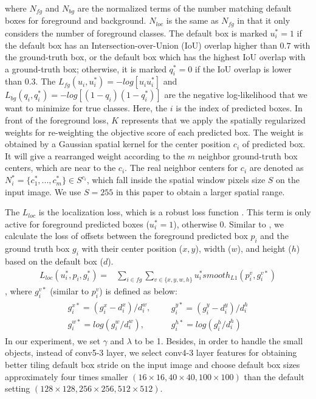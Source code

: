 \documentclass[10pt,twocolumn,letterpaper]{article}
\begin{document}
where $N_{fg}$ and $N_{bg}$ are the normalized terms of the number matching default boxes for foreground and background. $N_{loc}$ is the same as $N_{fg}$ in that it only considers the number of foreground classes. The default box is marked $u_{i}^{*} = 1$ if the default box has an Intersection-over-Union (IoU) overlap higher than $0.7$ with the ground-truth box, or the default box which has the highest IoU overlap with a ground-truth box; otherwise, it is marked $q_{i}^{*} = 0$ if the IoU overlap is lower than $0.3$. The $L_{fg}(u_{i}, u_{i}^{*}) = -log[u_{i}u_{i}^{*}]$ and $L_{bg}(q_{i}, q_{i}^{*}) = -log[(1-q_{i})(1-q_{i}^{*})]$ are the negative log-likelihood that we want to minimize for true classes. Here, the $i$ is the index of predicted boxes. In front of the foreground loss, $K$ represents that we apply the spatially regularized weights for re-weighting the objective score of each predicted box. The weight is obtained by a Gaussian spatial kernel for the center position $c_{i}$ of predicted box. It will give a rearranged weight according to the $m$ neighbor ground-truth box centers, which are near to the $c_{i}$. The real neighbor centers for $c_{i}$ are denoted as $N_{i}^{*} = \{c_{1}^{*},...,c_{m}^{*}\} \in S^{c_{i}}$, which fall inside the spatial window pixels size $S$ on the input image. We use $S = 255$ in this paper to obtain a larger spatial range.  

The $L_{loc}$ is the localization loss, which is a robust loss function \cite{20_girshick2015fast}. This term is only active for foreground predicted boxes ($u_{i}^{*} = 1$), otherwise $0$. Similar to \cite{21_ren2015faster}, we calculate the loss of offsets between the foreground predicted box $p_{i}$ and the ground truth box $g_{i}$ with their center position ($x, y$), width ($w$), and height ($h$) based on the default box ($d$).
\begin{equation} \label{eq:Llos}
\begin{aligned}
L_{loc}(u_{i}^{*}, p_{i}, g_{i}^{*}) =& \sum_{i \in fg} \sum_{v \in \{x, y, w, h\}} u_{i}^{*}smooth_{L1}(p_{i}^{v}, g_{i}^{v*})
\end{aligned}
\end{equation}
, where $g_{i}^{v*}$ (similar to $p_{i}^{v}$) is defined as below:
\begin{align}
  \begin{aligned}
   g_{i}^{x*} = (g_{i}^{x} - d_{i}^{x}) / d_{i}^{w}, \\       g_{i}^{w*} = log(g_{i}^{w} / d_{i}^{w}),
  \end{aligned}
  &&
  \begin{aligned}
   g_{i}^{y*} = (g_{i}^{y} - d_{i}^{y}) / d_{i}^{h} \\       g_{i}^{h*} = log(g_{i}^{h} / d_{i}^{h})
  \end{aligned}
 \end{align}
In our experiment, we set $\gamma$ and $\lambda$ to be 1. Besides, in order to handle the small objects, instead of conv5-3 layer, we select conv4-3 layer features for obtaining better tiling default box stride on the input image and choose default box sizes approximately four times smaller $(16\times16, 40\times40, 100\times100)$ than the default setting $(128\times128, 256\times256, 512\times512)$.
\end{document}
